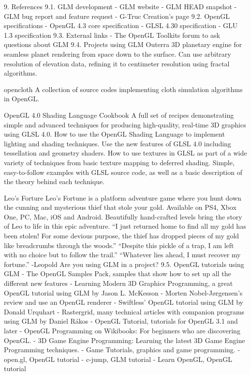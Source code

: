 \documentclass{scrartcl}
\numberwithin{figure}{subsection}
\begin{document}
9. References
9.1. GLM development
- GLM website
- GLM HEAD snapshot
- GLM bug report and feature request
- G-Truc Creation's page
9.2. OpenGL specifications
- OpenGL 4.3 core specification
- GLSL 4.30 specification
- GLU 1.3 specification
9.3. External links
- The OpenGL Toolkits forum to ask questions about GLM
9.4. Projects using GLM 
Outerra
3D planetary engine for seamless planet rendering from space down to the surface. Can use arbitrary resolution of elevation data, refining it to centimeter resolution using fractal algorithms.

opencloth
A collection of source codes implementing cloth simulation algorithms in OpenGL.

OpenGL 4.0 Shading Language Cookbook
A full set of recipes demonstrating simple and advanced techniques for producing high-quality, real-time 3D graphics using GLSL 4.0.
How to use the OpenGL Shading Language to implement lighting and shading techniques.
Use the new features of GLSL 4.0 including tessellation and geometry shaders.
How to use textures in GLSL as part of a wide variety of techniques from basic texture mapping to deferred shading.
Simple, easy-to-follow examples with GLSL source code, as well as a basic description of the theory behind each technique.


          
Leo's Forture 
Leo's Fortune is a platform adventure game where you hunt down the cunning and mysterious thief that stole your gold. Available on PS4, Xbox One, PC, Mac, iOS and Android.
Beautifully hand-crafted levels bring the story of Leo to life in this epic adventure. 
“I just returned home to find all my gold has been stolen! For some devious purpose, the thief has dropped pieces of my gold like breadcrumbs through the woods.”
“Despite this pickle of a trap, I am left with no choice but to follow the trail.” 
“Whatever lies ahead, I must recover my fortune.” -Leopold
Are you using GLM in a project?
9.5. OpenGL tutorials using GLM 
- The OpenGL Samples Pack, samples that show how to set up all the different new features
- Learning Modern 3D Graphics Programming, a great OpenGL tutorial using GLM by Jason L. McKesson
- Morten Nobel-Jørgensen's review and use an OpenGL renderer 
- Swiftless' OpenGL tutorial using GLM by Donald Urquhart
- Rastergrid, many technical articles with companion programs using GLM by Daniel Rákos
- OpenGL Tutorial, tutorials for OpenGL 3.1 and later
- OpenGL Programming on Wikibooks: For beginners who are discovering OpenGL.
- 3D Game Engine Programming: Learning the latest 3D Game Engine Programming techniques.
- Game Tutorials, graphics and game programming. 
- open.gl, OpenGL tutorial
- c-jump, GLM tutorial
- Learn OpenGL, OpenGL tutorial
\end{document}
